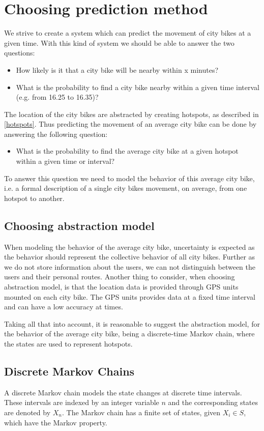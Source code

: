 \section{Choosing prediction method}\label{markov}
We strive to create a system which can predict the movement of city bikes at a given time. With this kind of system we should be able to answer the two questions:
\begin{itemize}
\item How likely is it that a city bike will be nearby within x minutes?
\item What is the probability to find a city bike nearby within a given time interval (e.g. from 16.25 to 16.35)?
\end{itemize}

The location of the city bikes are abstracted by creating hotspots, as described in \cref{hotspots}. Thus predicting the movement of an average city bike can be done by answering the following question:

\begin{itemize}
\item What is the probability to find the average city bike at a given hotspot within a given time or interval?
\end{itemize}

To answer this question we need to model the behavior of this average city bike, i.e. a formal description of a single city bikes movement, on average, from one hotspot to another.

\subsection{Choosing abstraction model}
When modeling the behavior of the average city bike, uncertainty is expected as the behavior should represent the collective behavior of all city bikes.
Further as we do not store information about the users, we can not distinguish between the users and their personal routes.
Another thing to consider, when choosing abstraction model, is that the location data is provided through GPS units mounted on each city bike. The GPS units provides data at a fixed time interval and can have a low accuracy at times.

Taking all that into account, it is reasonable to suggest the abstraction model, for the behavior of the average city bike, being a discrete-time Markov chain, where the states are used to represent hotspots. 

\subsection{Discrete Markov Chains}
A discrete Markov chain models the state changes at discrete time intervals.
These intervals are indexed by an integer variable $ n $ and the corresponding states are denoted by $ X_n $.
The Markov chain has a finite set of states, given $X_i \in S$, which have the Markov property.

